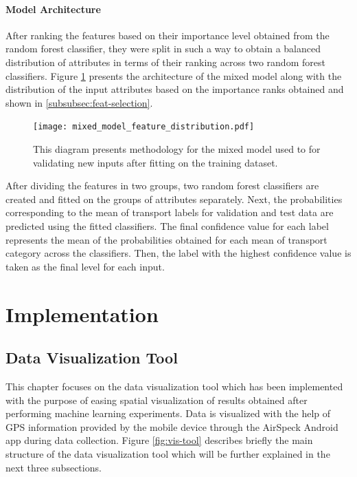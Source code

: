 \documentclass[bsc,frontabs,twoside,singlespacing,parskip,deptreport]{infthesis}     %
\begin{document}
\subsubsection{Model Architecture}

After ranking the features based on their importance level obtained from the random forest classifier, they were split in such a way to obtain a balanced distribution of attributes in terms of their ranking across two random forest classifiers. Figure \ref{fig:mixed_model_feature_distribution} presents the architecture of the mixed model along with the distribution of the input attributes based on the importance ranks obtained and shown in \ref{subsubsec:feat-selection}.

\begin{figure}[h!]
  \center
  \texttt{[image: mixed\_model\_feature\_distribution.pdf]}
  \caption{This diagram presents methodology for the mixed model used to for validating new inputs after fitting on the training dataset.}
  \label{fig:mixed_model_feature_distribution}
\end{figure}

After dividing the features in two groups, two random forest classifiers are created and fitted on the groups of attributes separately. Next, the probabilities corresponding to the mean of transport labels for validation and test data are predicted using the fitted classifiers. The final confidence value for each label represents the mean of the probabilities obtained for each mean of transport category across the classifiers. Then, the label with the highest confidence value is taken as the final level for each input.


\chapter{Implementation}

\section{Data Visualization Tool}
\label{sec:data-visualization-tool}

This chapter focuses on the data visualization tool which has been implemented with the purpose of easing spatial visualization of results obtained after performing machine learning experiments. Data is visualized with the help of GPS information provided by the mobile device through the AirSpeck Android app during data collection. Figure \ref{fig:vis-tool} describes briefly the main structure of the data visualization tool which will be further explained in the next three subsections.
\end{document}
